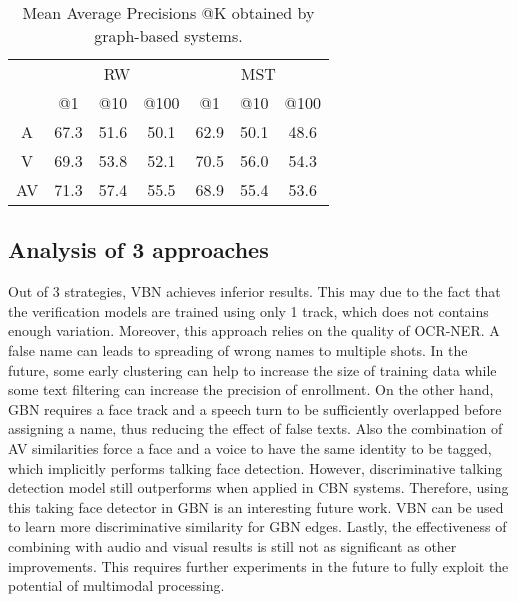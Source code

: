 \begin{table}[tb]
\label{tab:graph}
\centering
\vspace*{-5mm}
\caption{Mean Average Precisions @K obtained by graph-based systems.}
\vspace*{-2mm}
\begin{tabular}{c|c|c|c|| c|c|c|}
\cline{2-7}
  &  \multicolumn{3}{|c||}{RW} &  \multicolumn{3}{|c|}{MST} \\ \cline{2-7}
           & @1& @10& @100   & @1& @10& @100 \\ \hline
 \multicolumn{1}{|c|}{A} & 67.3 &  51.6 & 50.1  & 62.9 &  50.1 & 48.6\\ \hline
 \multicolumn{1}{|c|}{V} & 69.3  & 53.8 & 52.1 & 70.5  & 56.0 & 54.3\\ \hline
 \multicolumn{1}{|c|}{AV} & 71.3 &  57.4 & 55.5 &  68.9 &  55.4 & 53.6\\ \hline
\end{tabular}
\vspace*{-5mm}
\end{table}

\subsection{Analysis of 3 approaches}

Out of 3 strategies, VBN achieves inferior results. This may due to the fact that the verification models are trained using only 1 track, which does not contains enough variation. 
%
Moreover, this approach relies on the quality of OCR-NER. A false name can leads to spreading of wrong names to multiple shots. In the future, some early clustering can help to increase the size of training data while some text filtering can increase the precision of enrollment.
%
On the other hand, GBN requires a face track and a speech turn to be sufficiently overlapped before assigning a name, thus reducing the effect of false texts. Also the combination of AV similarities force a face and a voice to have the same identity to be tagged, which implicitly performs talking face detection.
%
However, discriminative talking detection model still outperforms when applied in CBN systems. Therefore, using this taking face detector in GBN is an interesting future work. 
%
VBN can be used to learn more discriminative similarity for GBN edges.
%
Lastly, the effectiveness of combining with audio and visual results is still not as significant as other improvements. This requires further experiments in the future to fully exploit the potential of multimodal processing.

